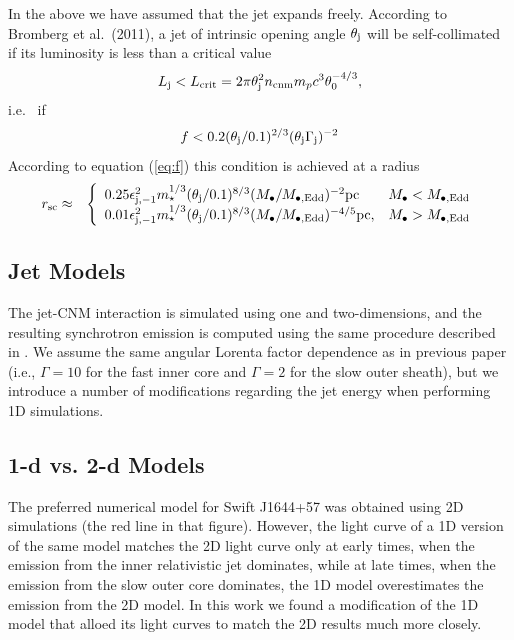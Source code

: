 \documentclass[usenatbib,fleqn]{mnras}
\newcommand       \be          {\begin{eqnarray}}
\newcommand       \ee          {\end{eqnarray}}
\begin{document}
In the above we have assumed that the jet expands freely.  According to Bromberg et al.~(2011), a jet of intrinsic opening angle $\theta_{\rm j}$ will be self-collimated if its luminosity is less than a critical value
\be
L_{\rm j} < L_{\rm crit} = 2\pi \theta_{\rm j}^{2}n_{\rm cnm} m_p c^{3}\theta_0^{-4/3},
\ee
i.e.~ if
\be
f < 0.2(\theta_{\rm j}/0.1)^{2/3}(\theta_{\rm j}\Gamma_{\rm j})^{-2}
\ee
According to equation (\ref{eq:f}) this condition is achieved at a radius 
\begin{eqnarray}
r_{\rm sc}  &\approx & \left\{
\begin{array}{lr}
0.25\epsilon_{\rm j,-1}^{2}m_{\star}^{1/3}(\theta_{\rm j}/0.1)^{8/3}(M_{\bullet}/M_{\bullet, \rm Edd})^{-2}{\rm pc}
&  M_{\bullet} < M_{\bullet, \rm Edd} \\
0.01\epsilon_{\rm j,-1}^{2}m_{\star}^{1/3}(\theta_{\rm j}/0.1)^{8/3}(M_{\bullet}/M_{\bullet, \rm Edd})^{-4/5}{\rm pc}
,& M_{\bullet} > M_{\bullet, \rm Edd}\\
\end{array}
\right. 
\label{eq:rsc}
\end{eqnarray}


\subsection{Jet Models}

The jet-CNM interaction is simulated using one and two-dimensions, and the resulting synchrotron emission is computed using the same procedure described in \citet{Mimica+2015}. We assume the same angular Lorenta factor dependence as in previous paper (i.e., $\Gamma = 10$ for the fast inner core and $\Gamma = 2$ for the slow outer sheath), but we introduce a number of modifications regarding the jet energy when performing 1D simulations.

\subsection{1-d vs. 2-d Models}
\label{sec:2d}

The preferred numerical model for Swift J1644+57 \citep[Fig.10 in][]{Mimica+2015} was obtained using 2D simulations (the red line in that figure). However, the light curve of a 1D version of the same model \citep[black line in Fig. 10 in][see also section 4.2 of that paper]{Mimica+2015} matches the 2D light curve only at early times, when the emission from the inner relativistic jet dominates, while at late times, when the emission from the slow outer core dominates, the 1D model overestimates the emission from the 2D model. In this work we found a modification of the 1D model that alloed its light curves to match the 2D results much more closely.
\end{document}
